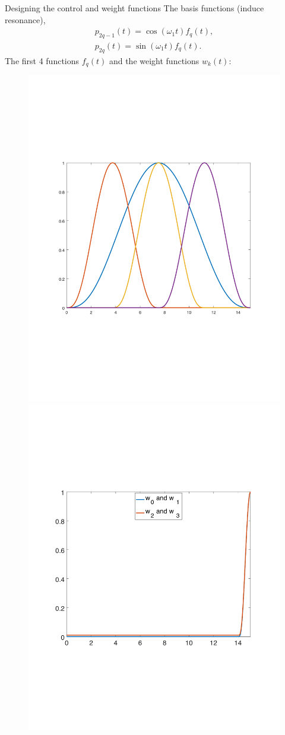 \documentclass{beamer}
\begin{document}
\begin{frame}{Designing the control and weight functions}
  The basis functions (induce resonance),
  \begin{align*}
    p_{2q-1}(t) = \cos(\omega_1 t) f_q(t),\\
    p_{2q}(t) = \sin(\omega_1 t) f_q(t).
  \end{align*}
  The first 4 functions $f_q(t)$ and the weight functions $w_k(t)$:
  \begin{figure}
    \includegraphics[width=0.45\linewidth]{basicTimeFunctions.pdf}\hspace{5mm}
    \includegraphics[width=0.45\linewidth]{weight.pdf}
  \end{figure}
\end{frame}
\end{document}
